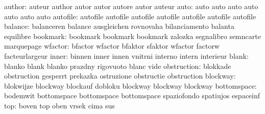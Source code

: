                    author: auteur                    author
                           autor                     autor
                           autore                    autor
                           auteur
                     auto: auto                      auto
                           auto                      auto
                           auto                      auto
                           auto
                 autofile: autofile                  autofile
                           autofile                  autofile
                           autofile                  autofile
                           autofile %
                  balance: balanceren                balance
                           ausgleichen               rovnovaha
                           bilanciamento             balanta
                           equilibre
                 bookmark: bookmark                  bookmark
                           bookmark                  zalozka
                           segnalibro                semncarte
                           marquepage
                  wfactor: bfactor                   wfactor
                           bfaktor                   sfaktor
                           wfactor                   factorw
                           facteurlargeur
                    inner: binnen                    inner
                           innen                     vnitrni
                           interno                   intern
                           interieur
                    blank: blanko                    blank
                           blanko                    prazdny
                           rigovuoto                 blanc
                           vide
              obstruction: blokkade                  obstruction
                           gesperrt                  prekazka
                           ostruzione                obstructie
                           obstruction
                 blockway: blokwijze                 blockway
                           blockauf                  dobloku
                           blockway                  blockway
                           blockway
              bottomspace: bodemwit                  bottomspace
                           bottomspace               bottomspace
                           spaziofondo               spatiujos
                           espaceinf
                      top: boven                     top
                           oben                      vrsek
                           cima                      sus
